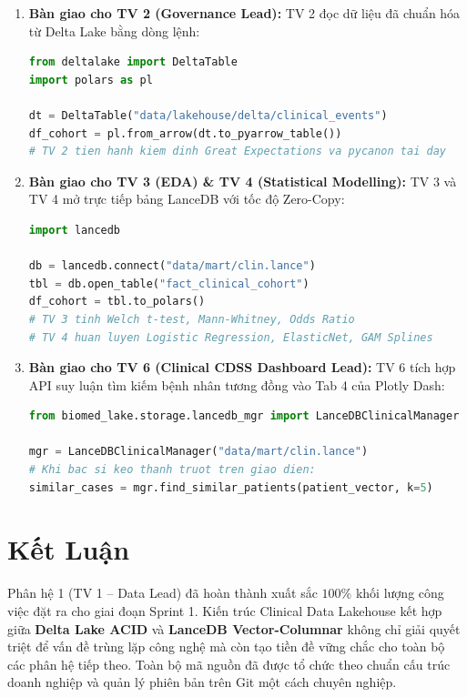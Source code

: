 \documentclass[11pt,a4paper]{article}
\begin{document}
\begin{enumerate}
    \item \textbf{Bàn giao cho TV 2 (Governance Lead):}
    TV 2 đọc dữ liệu đã chuẩn hóa từ Delta Lake bằng dòng lệnh:
    \begin{lstlisting}[language=Python]
from deltalake import DeltaTable
import polars as pl

dt = DeltaTable("data/lakehouse/delta/clinical_events")
df_cohort = pl.from_arrow(dt.to_pyarrow_table())
# TV 2 tien hanh kiem dinh Great Expectations va pycanon tai day
    \end{lstlisting}
    
    \item \textbf{Bàn giao cho TV 3 (EDA) \& TV 4 (Statistical Modelling):}
    TV 3 và TV 4 mở trực tiếp bảng LanceDB với tốc độ Zero-Copy:
    \begin{lstlisting}[language=Python]
import lancedb

db = lancedb.connect("data/mart/clin.lance")
tbl = db.open_table("fact_clinical_cohort")
df_cohort = tbl.to_polars()
# TV 3 tinh Welch t-test, Mann-Whitney, Odds Ratio
# TV 4 huan luyen Logistic Regression, ElasticNet, GAM Splines
    \end{lstlisting}
    
    \item \textbf{Bàn giao cho TV 6 (Clinical CDSS Dashboard Lead):}
    TV 6 tích hợp API suy luận tìm kiếm bệnh nhân tương đồng vào Tab 4 của Plotly Dash:
    \begin{lstlisting}[language=Python]
from biomed_lake.storage.lancedb_mgr import LanceDBClinicalManager

mgr = LanceDBClinicalManager("data/mart/clin.lance")
# Khi bac si keo thanh truot tren giao dien:
similar_cases = mgr.find_similar_patients(patient_vector, k=5)
    \end{lstlisting}
\end{enumerate}

\section{Kết Luận}
Phân hệ 1 (TV 1 -- Data Lead) đã hoàn thành xuất sắc $100\%$ khối lượng công việc đặt ra cho giai đoạn Sprint 1. Kiến trúc Clinical Data Lakehouse kết hợp giữa \textbf{Delta Lake ACID} và \textbf{LanceDB Vector-Columnar} không chỉ giải quyết triệt để vấn đề trùng lặp công nghệ mà còn tạo tiền đề vững chắc cho toàn bộ các phân hệ tiếp theo. Toàn bộ mã nguồn đã được tổ chức theo chuẩn cấu trúc doanh nghiệp và quản lý phiên bản trên Git một cách chuyên nghiệp.
\end{document}
